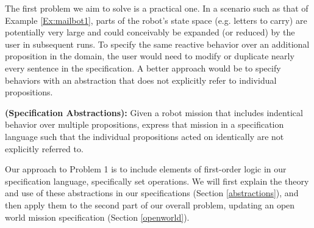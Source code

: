 The first problem we aim to solve is a practical one. In a scenario such as that of Example \ref{Ex:mailbot1}, parts of the robot's state space (e.g. letters to carry)  are potentially very large and could conceivably be expanded (or reduced) by the user in subsequent runs. To specify the same reactive behavior over an additional proposition in the domain, the user would need to modify or duplicate nearly every sentence in the specification. A better approach would be to specify behaviors with an abstraction that does not explicitly refer to individual propositions.  

\begin{myProblem}\label{Prop:groups}
	\textbf{(Specification Abstractions):}
	Given a robot mission that includes indentical behavior over multiple propositions, express that mission in a specification language such that the individual propositions acted on identically are not explicitly referred to. 
\end{myProblem}

Our approach to Problem 1 is to include elements of first-order logic in our specification language, specifically set operations. We will first explain the theory and use of these abstractions in our specifications (Section \ref{abstractions}), and then apply them to the second part of our overall problem, updating an open world mission specification (Section \ref{openworld}). 

